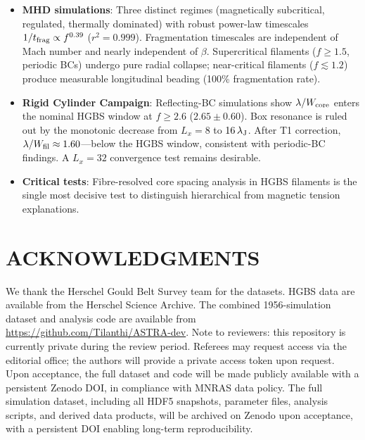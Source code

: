 \documentclass[twoside,twocolumn]{mnras}
\begin{document}
\begin{itemize}
    \item \textbf{MHD simulations}: Three distinct regimes (magnetically subcritical,
    regulated, thermally dominated) with robust power-law timescales
    $1/t_{\rm frag} \propto f^{0.39}$ ($r^2 = 0.999$). Fragmentation timescales are
    independent of Mach number and nearly independent of $\beta$. Supercritical filaments
    ($f \geq 1.5$, periodic BCs) undergo pure radial collapse; near-critical filaments
    ($f \lesssim 1.2$) produce measurable longitudinal beading (100\% fragmentation rate).

    \item \textbf{Rigid Cylinder Campaign}: Reflecting-BC simulations show $\lambda/W_{\rm core}$
    enters the nominal HGBS window at $f \geq 2.6$ ($2.65 \pm 0.60$). Box resonance is
    ruled out by the monotonic decrease from $L_x = 8$ to $16\,\lambda_{\rm J}$.
    After T1 correction, $\lambda/W_{\rm fil} \approx 1.60$---below the HGBS window,
    consistent with periodic-BC findings. A $L_x = 32$ convergence test remains desirable.

    \item \textbf{Critical tests}: Fibre-resolved core spacing analysis in HGBS
    filaments is the single most decisive test to distinguish hierarchical from magnetic
    tension explanations.

\end{itemize}

\section*{ACKNOWLEDGMENTS}

We thank the Herschel Gould Belt Survey team for the datasets. HGBS data are available
from the Herschel Science Archive. The combined 1956-simulation dataset and analysis code are available from
\url{https://github.com/Tilanthi/ASTRA-dev}. Note to reviewers: this repository is currently private during the review period.
Referees may request access via the editorial office; the authors will provide a
private access token upon request. Upon acceptance, the full dataset and code will
be made publicly available with a persistent Zenodo DOI, in compliance with MNRAS
data policy. The full simulation
dataset, including all HDF5 snapshots, parameter files, analysis scripts, and derived
data products, will be archived on Zenodo upon acceptance, with a persistent DOI enabling
long-term reproducibility.



\end{document}
